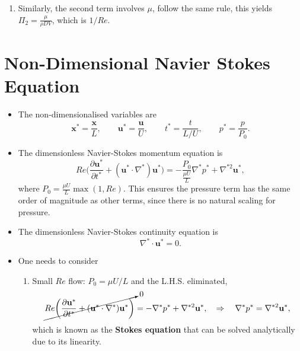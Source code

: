 \documentclass[a4paper]{article}
\begin{document}
\begin{tcolorbox}[title = \textbf{Example}]
\begin{enumerate}
    \item Similarly, the second term involves $\mu$, follow the same rule, this yields $\displaystyle \boxed{\Pi_2 = \frac{\mu}{\rho DV}}$, which is $1/Re$.
\end{enumerate}
\end{tcolorbox}

\section{Non-Dimensional Navier Stokes Equation}
\begin{itemize}
    \item The non-dimensionalised variables are
    \[
        \mathbf{x}^* = \frac{\mathbf{x}}{L},
        \quad \quad
        \mathbf{u}^* = \frac{\mathbf{u}}{U},
        \quad \quad
        t^* = \frac{t}{L/U},
        \quad \quad
        p^* = \frac{p}{P_0}.
    \]

    \item The dimensionless Navier-Stokes momentum equation is
     \[ 
        Re\bigg(\frac{\partial \mathbf{u^{*}}}{\partial t^{*}} + (\mathbf{u^{*}}\cdot \nabla^{*})\mathbf{u^{*}} \bigg) = -\frac{P_{0}}{\frac{\mu U}{L}}\nabla^{*} p^{*} + \nabla^{*2}\mathbf{u^{*}},
     \]
    where $\displaystyle P_{0} = \frac{\mu U}{L}\max(1,Re)$. This ensures the pressure term has the same order of magnitude as other terms, since there is no natural scaling for pressure.

    \item The dimensionless Navier-Stokes continuity equation is
     \[ \nabla^{*} \cdot \mathbf{u}^{*} = 0.\]
     
     \item One needs to consider
     \begin{enumerate}
         \item {\color{red}Small $Re$ flow}: $P_0 = \mu U/L$ and the L.H.S. eliminated,
        \[ 
            \cancelto{0}{Re\bigg(\frac{\partial \mathbf{u^{*}}}{\partial t^{*}} + (\mathbf{u^{*}}\cdot \nabla^{*})\mathbf{u^{*}} \bigg)} = -\nabla^{*} p^{*} + \nabla^{*2}\mathbf{u^{*}},
            \quad \Rightarrow \quad
            \nabla^{*} p^{*} = \nabla^{*2}\mathbf{u^{*}},
        \]
        which is known as the \textbf{Stokes equation} that can be solved analytically due to its linearity.
        

\end{enumerate}
\end{itemize}
\end{document}
